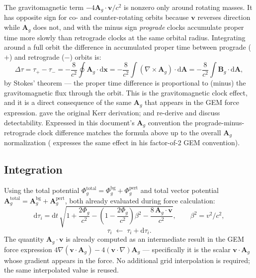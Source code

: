 \documentclass[11pt,a4paper]{article}
\newcommand{\vv}[1]{\mathbf{#1}}
\newcommand{\Phig}{\Phi_g}
\newcommand{\Ag}{\vv{A}_g}
\newcommand{\dd}{\mathrm{d}}
\begin{document}
The gravitomagnetic term $-4\Ag\cdot\vv{v}/c^2$ is nonzero only around rotating masses.  It has opposite sign for co- and counter-rotating orbits because $\vv{v}$ reverses direction while $\Ag$ does not, and with the minus sign \emph{prograde} clocks accumulate proper time more slowly than retrograde clocks at the same orbital radius.  Integrating around a full orbit the difference in accumulated proper time between prograde ($+$) and retrograde ($-$) orbits is:
\begin{equation}
  \Delta\tau = \tau_+ - \tau_- = -\frac{8}{c^2}\oint\Ag\cdot\dd\vv{x} = -\frac{8}{c^2}\int(\nabla\times\Ag)\cdot\dd\vv{A} = -\frac{8}{c^2}\int\vv{B}_g\cdot\dd\vv{A},
\end{equation}
by Stokes' theorem --- the proper time difference is proportional to (minus) the gravitomagnetic flux through the orbit.  This is the gravitomagnetic clock effect, and it is a direct consequence of the same $\Ag$ that appears in the GEM force expression.  \cite{CohenMashhoon1993} gave the original Kerr derivation; \cite{Iorio2001} and \cite{Tartaglia2000} re-derive and discuss detectability.  Expressed in this document's $\Ag$ convention the prograde-minus-retrograde clock difference matches the formula above up to the overall $\Ag$ normalization (\cite{Mashhoon2003} expresses the same effect in his factor-of-2 GEM convention).

\subsection{Integration}

Using the total potential $\Phig^{\mathrm{total}} = \Phig^{\mathrm{bg}} + \Phig^{\mathrm{pert}}$ and total vector potential $\Ag^{\mathrm{total}} = \Ag^{\mathrm{bg}} + \Ag^{\mathrm{pert}}$, both already evaluated during force calculation:
\begin{equation}
  \dd\tau_i = \dd t\,\sqrt{1 + \frac{2\Phig}{c^2} - \left(1-\frac{2\Phig}{c^2}\right)\beta^2 - \frac{8\,\Ag\cdot\vv{v}}{c^2}},
  \qquad \beta^2 = v^2/c^2,
\end{equation}
\begin{equation}
  \tau_i \;\leftarrow\; \tau_i + \dd\tau_i.
\end{equation}
The quantity $\Ag\cdot\vv{v}$ is already computed as an intermediate result in the GEM force expression $4\nabla(\vv{v}\cdot\Ag) - 4(\vv{v}\cdot\nabla)\Ag$ --- specifically it is the scalar $\vv{v}\cdot\Ag$ whose gradient appears in the force.  No additional grid interpolation is required; the same interpolated value is reused.
\end{document}
